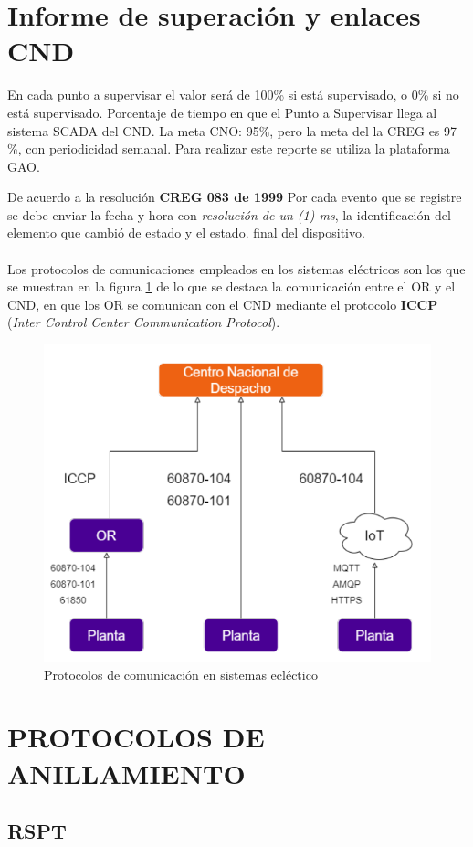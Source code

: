 \documentclass[a5paper]{book}%
\begin{document}
\section{Informe de superación y enlaces CND}

  En cada punto a supervisar el valor será de 100\% si está supervisado, o 0\% si no está supervisado. Porcentaje de tiempo en que el Punto a Supervisar llega al sistema SCADA del CND. La meta CNO: 95\%, pero la meta del la CREG es 97 \%,  con periodicidad semanal. Para realizar este reporte se utiliza la plataforma GAO.

  De acuerdo a la resolución \textbf{CREG 083 de 1999} Por cada evento que se registre se debe enviar la fecha y hora con \textit{resolución de un (1) ms}, la identificación del elemento que cambió de estado y el estado. final del dispositivo.\\\\

  
Los protocolos de comunicaciones empleados en los sistemas eléctricos son los que se muestran en la figura \ref{fig:protocoloscomunicacion} de lo que se destaca la comunicación entre el \ac{OR} y el \ac{CND}, en que los OR se comunican con el \ac{CND} mediante el protocolo \textbf{ICCP} (\textit{Inter Control Center Communication Protocol}).

\begin{figure}[H]
  \centering
  \caption{Protocolos de comunicación en sistemas ecléctico}
  \label{fig:protocoloscomunicacion}
  \includegraphics[width=0.5\linewidth]{protocolos_comunicacion}
\end{figure}

\section{PROTOCOLOS DE ANILLAMIENTO}
\subsection{RSPT}
\end{document}

